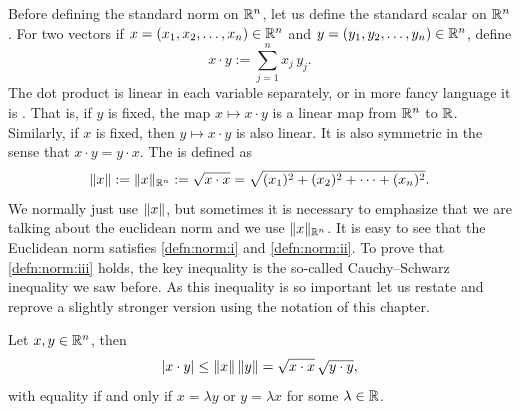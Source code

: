 Before defining the standard norm on ${\mathbb{R}}^n$, let us
define the standard 
scalar \emph{} on ${\mathbb{R}}^n$.  For two vectors
if $x=(x_1,x_2,\ldots,x_n) \in {\mathbb{R}}^n$
and $y=(y_1,y_2,\ldots,y_n) \in {\mathbb{R}}^n$, define
\begin{equation*}
x \cdot y := \sum_{j=1}^n x_j\, y_j .
\end{equation*}
The dot product is linear in each variable
separately, or in more fancy language it is \emph{}.
That is,
if $y$ is fixed, the map $x \mapsto x \cdot y$ is a linear map from
${\mathbb{R}}^n$ to ${\mathbb{R}}$.  Similarly, if $x$ is fixed, then
$y \mapsto x \cdot y$ is also linear.
It is also symmetric in the sense that $x \cdot y = y \cdot x$.
The \emph{} is defined as
\begin{equation*}
\lVert {x} \rVert := \lVert {x} \rVert_{{\mathbb{R}}^n} := \sqrt{x \cdot x} = \sqrt{(x_1)^2+(x_2)^2 + \cdots + (x_n)^2}.
\end{equation*}
We normally just use $\lVert {x} \rVert$, but sometimes it is necessary to
emphasize that we are talking about the euclidean norm and we use
$\lVert {x} \rVert_{{\mathbb{R}}^n}$.
It is easy to see that the Euclidean norm satisfies \ref{defn:norm:i} and
\ref{defn:norm:ii}.  To prove
that \ref{defn:norm:iii} holds, the key
inequality is the so-called Cauchy--Schwarz inequality
we saw before.  As this inequality is so important let us restate and
reprove a slightly stronger version using the notation of this chapter.

\begin{thm}
Let $x, y \in {\mathbb{R}}^n$, then
\begin{equation*}
\lvert {x \cdot y} \rvert \leq \lVert {x} \rVert \, \lVert {y} \rVert = \sqrt{x\cdot x}\, \sqrt{y\cdot y},
\end{equation*}
with equality if and only if $x = \lambda y$ or $y = \lambda x$ for some
$\lambda \in {\mathbb{R}}$.
\end{thm}

